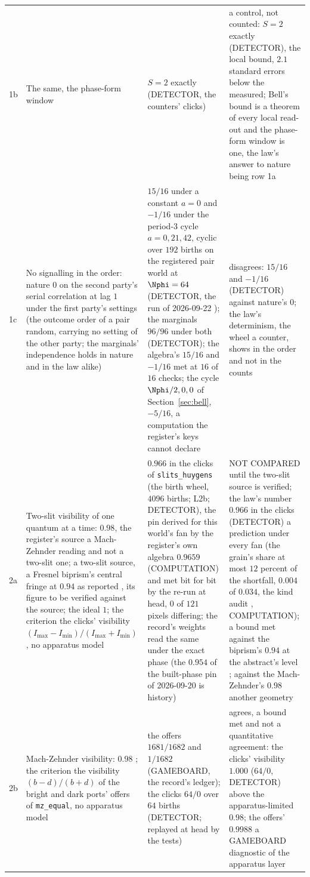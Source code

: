 {\begin{longtable}{L{0.3in}L{2.0in}L{1.5in}L{2.2in}}
1b & The same, the phase-form window & $S = 2$ exactly (DETECTOR, the counters' clicks) & a control, not counted: $S = 2$ exactly (DETECTOR), the local bound, $2.1$ standard errors below the measured; Bell's bound is a theorem of every local read-out and the phase-form window is one, the law's answer to nature being row 1a \\
1c & No signalling in the order: nature $0$ on the second party's serial correlation at lag $1$ under the first party's settings (the outcome order of a pair random, carrying no setting of the other party; the marginals' independence holds in nature and in the law alike) & $15/16$ under a constant $a = 0$ and $-1/16$ under the period-$3$ cycle $a = 0, 21, 42$, cyclic over $192$ births on the registered pair world at $\Nphi = 64$ (DETECTOR, the run of 2026-09-22 \cite{orderchannel}); the marginals $96/96$ under both (DETECTOR); the algebra's $15/16$ and $-1/16$ met at $16$ of $16$ checks; the cycle $\Nphi/2, 0, 0$ of Section~\ref{sec:bell}, $-5/16$, a computation the register's keys cannot declare & disagrees: $15/16$ and $-1/16$ (DETECTOR) against nature's $0$; the law's determinism, the wheel a counter, shows in the order and not in the counts \\
2a & Two-slit visibility of one quantum at a time: $0.98$, the register's source \cite{grangier1986} a Mach-Zehnder reading and not a two-slit one; a two-slit source, a Fresnel biprism's central fringe at $0.94$ as reported \cite{jacques2005}, its figure to be verified against the source; the ideal $1$; the criterion the clicks' visibility $(I_{\max} - I_{\min})/(I_{\max} + I_{\min})$, no apparatus model & $0.966$ in the clicks of \texttt{slits\_huygens} (the birth wheel, $4096$ births; L2b; DETECTOR), the pin derived for this world's fan by the register's own algebra $0.9659$ (COMPUTATION) and met bit for bit by the re-run at head, $0$ of $121$ pixels differing; the record's weights read the same under the exact phase (the $0.954$ of the built-phase pin of 2026-09-20 is history) & NOT COMPARED until the two-slit source is verified; the law's number $0.966$ in the clicks (DETECTOR) a prediction under every fan (the grain's share at most $12$ percent of the shortfall, $0.004$ of $0.034$, the kind audit \cite[section 3]{kindaudit}, COMPUTATION); a bound met against the biprism's $0.94$ at the abstract's level \cite{jacques2005}; against the Mach-Zehnder's $0.98$ another geometry \\
2b & Mach-Zehnder visibility: $0.98$ \cite{grangier1986}; the criterion the visibility $(b - d)/(b + d)$ of the bright and dark ports' offers of \texttt{mz\_equal}, no apparatus model & the offers $1681/1682$ and $1/1682$ (GAMEBOARD, the record's ledger); the clicks $64/0$ over $64$ births (DETECTOR; replayed at head by the tests) & agrees, a bound met and not a quantitative agreement: the clicks' visibility $1.000$ ($64/0$, DETECTOR) above the apparatus-limited $0.98$; the offers' $0.9988$ a GAMEBOARD diagnostic of the apparatus layer \\

\end{longtable}}
